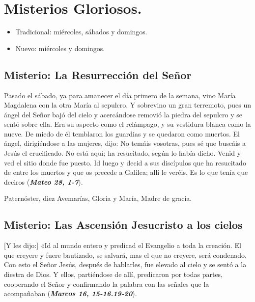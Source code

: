 \documentclass[./rosary.tex]{subfiles}
\newcounter{glorious-counter}
\begin{document}
\section*{Misterios Gloriosos.}
\begin{itemize}
      \item Tradicional: miércoles, sábados y domingos.
      \item Nuevo: miércoles y domingos.
\end{itemize}

\subsection*{ Misterio: La Resurrección del Señor}

Pasado el sábado, ya para amanecer el día primero de la semana, vino María Magdalena con la otra María al sepulcro. Y sobrevino un gran terremoto, 
pues un ángel del Señor bajó del cielo y acercándose removió la piedra del sepulcro y se sentó sobre ella. Era su aspecto como el relámpago, 
y su vestidura blanca como la nueve. De miedo de él temblaron los guardias y se quedaron como muertos. El ángel, dirigiéndose a las mujeres, dijo:
No temáis vosotras, pues sé que buscáis a Jesús el crucificado. No está aquí; ha resucitado, según lo había dicho. Venid y ved el sitio donde fue puesto.
Id luego y decid a sus discípulos que ha resucitado de entre los muertos y que os precede a Galilea; allí le veréis. Es lo que tenía que deciros (\textbf{\emph{Mateo 28, 1-7}}).

\begin{center}
      Paternóster, diez Avemarías, Gloria y María, Madre de gracia.
\end{center}

\subsection*{ Misterio: Las Ascensión Jesucristo a los cielos}

[Y les dijo:] «Id al mundo entero y predicad el Evangelio a toda la creación. El que creyere y fuere bautizado, se salvará, mas el que no creyere, será condenado. 
Con esto el Señor Jesús, después de hablarles, fue elevado al cielo y se sentó a la diestra de Dios. Y ellos, partiéndose de allí, predicaron por todas partes, 
cooperando el Señor y confirmando la palabra con las señales que la acompañaban (\textbf{\emph{Marcos 16, 15-16.19-20}}).
\end{document}
